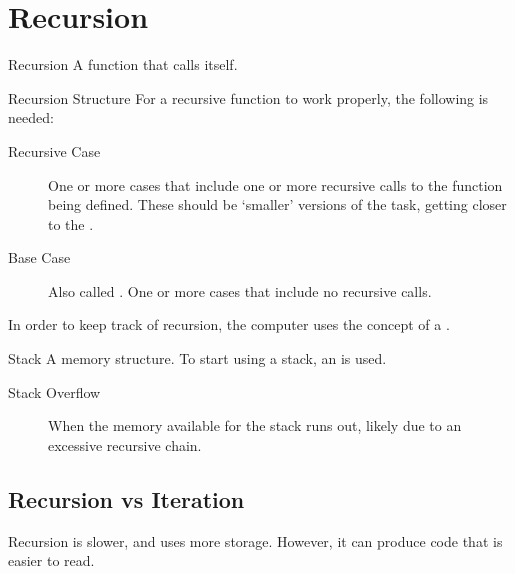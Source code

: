 \documentclass[\main/notes.tex]{subfiles}
\begin{document}
	\setcounter{chapter}{7}
	\chapter{Recursion}
		\begin{definition}{Recursion}
			A function that calls itself.
		\end{definition}
		\begin{sidenote}{Recursion Structure}
			For a recursive function to work properly, the following is needed:
			\begin{indentparagraph}
				\begin{description}
					\item[Recursive Case] One or more cases that include one or more recursive calls to the function being defined. These should be `smaller' versions of the task, getting closer to the .
					\item[Base Case] Also called . One or more cases that include no recursive calls.
				\end{description}
			\end{indentparagraph}
		\end{sidenote}
		In order to keep track of recursion, the computer uses the concept of a \concept{stack}.
		\begin{definition}{Stack}
			A  memory structure. To start using a stack, an  is used.
			\begin{indentparagraph}
				\begin{description}
					\item[Stack Overflow] When the memory available for the stack runs out, likely due to an excessive recursive chain.
				\end{description}
			\end{indentparagraph}
		\end{definition}
		\section{Recursion vs Iteration}
			Recursion is slower, and uses more storage. However, it can produce code that is easier to read.
\end{document}
